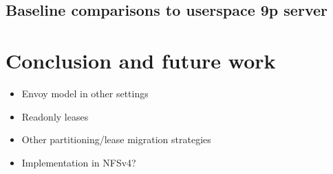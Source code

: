 \documentclass[a4paper]{article}
\begin{document}
\subsection{Baseline comparisons to userspace 9p server}
\subsection{}

\section{Conclusion and future work}
\begin{itemize}
\item Envoy model in other settings
\item Readonly leases
\item Other partitioning/lease migration strategies
\item Implementation in NFSv4?
\end{itemize}

\nocite{*}

\end{document}
